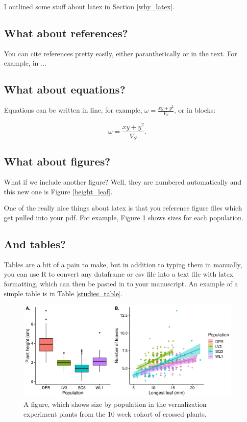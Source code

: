 \documentclass[11pt]{article}
\begin{document}
I outlined some stuff about latex in Section \ref{why_latex}.


\subsection{What about references?}

You can cite references pretty easily, either paranthetically \citep{turesson1922species, clausen1948experimental} or in the text. For example, in \citet{savolainen2007gene}...

\subsection{What about equations?}

Equations can be written in line, for example, $\omega = \frac{xy + y^2}{V_S}$, or in blocks:

\begin{equation}
  \omega = \frac{xy + y^2}{V_S}.
\end{equation}

\subsection{What about figures?}

What if we include another figure? Well, they are numbered automatically and this new one is Figure \ref{height_leaf}.

One of the really nice things about latex is that you reference figure files which get pulled into your pdf. For example, Figure \ref{size} shows sizes for each population. 


\subsection{And tables?}

Tables are a bit of a pain to make, but in addition to typing them in manually, you can use R to convert any dataframe or csv file into a text file with latex formatting, which can then be pasted in to your manuscript. An example of a simple table is in Table \ref{studies_table}.

\clearpage

\begin{figure}
\centering
  \includegraphics[width=\textwidth]{../plots/size_by_pop.pdf}
  \caption{A figure, which shows size by population in the vernalization experiment plants from the 10 week cohort of crossed plants.}
  \label{size}
\end{figure}
\end{document}
